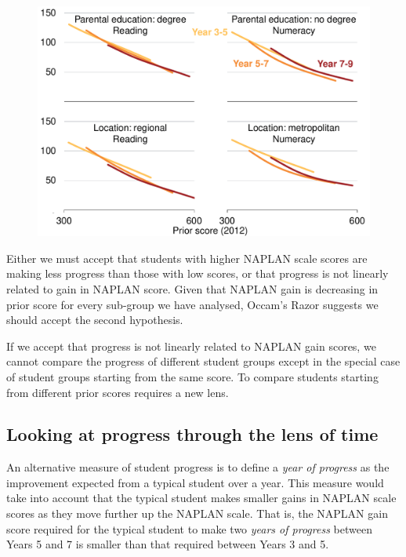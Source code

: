 \begin{figure}[t]
 \includegraphics[width=\columnwidth]{atlas/Gain_prior.pdf}\label{fig:gain_prior}

\end{figure}

Either we must accept that students with higher NAPLAN scale scores are making less progress than those with low scores, or that progress is not linearly related to gain in NAPLAN score. Given that NAPLAN gain is decreasing in prior score for every sub-group we have analysed, Occam's Razor suggests we should accept the second hypothesis.

If we accept that progress is not linearly related to NAPLAN gain scores, we cannot compare the progress of different student groups except in the special case of student groups starting from the same score. To compare students starting from different prior scores requires a new lens.

\subsection{Looking at progress through the lens of time}

An alternative measure of student progress is to define a \textit{year of progress} as the improvement expected from a typical student over a year. This measure would take into account that the typical student makes smaller gains in NAPLAN scale scores as they move further up the NAPLAN scale. That is, the NAPLAN gain score required for the typical student to make two \textit{years of progress} between Years 5 and 7 is smaller than that required between Years 3 and 5.

